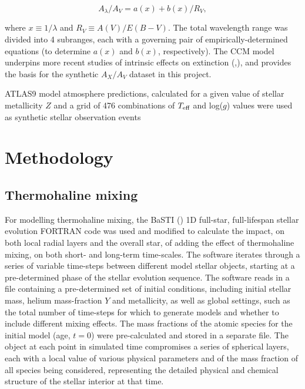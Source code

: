 \documentclass[usenatbib]{mnras}
\begin{document}
\begin{equation}
A_{\lambda}/A_{V} = a(x) + b(x)/R_{V},
\label{CCM_general}
\end{equation}

where $x \equiv 1/\lambda$ and $R_{V} \equiv A(V)/E(B-V)$. The total wavelength range was divided into 4 subranges, each with a governing pair of empirically-determined equations (to determine $a(x)$ and $b(x)$, respectively). The CCM model underpins more recent studies of intrinsic effects on extinction (\citet{2018MNRAS.479L.102C},\citet{2008PASP..120..583G}), and provides the basis for the synthetic  $A_{X}/A_{V}$ dataset in this project.

ATLAS9 model atmosphere predictions, calculated for a given value of stellar metallicity $Z$ and a grid of 476 combinations of $T_{\textnormal{eff}}$ and log($g$) values \citep{2004astro.ph..5087C} were used as synthetic stellar observation events
\section{Methodology} \label{Methodology}
\subsection{Thermohaline mixing}

For modelling thermohaline mixing, the BaSTI (\citet{2004ApJ...612..168P}) 1D full-star, full-lifespan stellar evolution FORTRAN code was used and modified to calculate the impact, on both local radial layers and the overall star, of adding the effect of thermohaline mixing, on both short- and long-term time-scales. The software iterates through a series of variable time-steps between different model stellar objects, starting at a pre-determined phase of the stellar evolution sequence. The software reads in a file containing a pre-determined set of initial conditions, including initial stellar mass, helium mass-fraction $Y$ and metallicity, as well as global settings, such as the total number of time-steps for which to generate models and whether to include different mixing effects. The mass fractions of the atomic species for the initial model (age, $t = 0$) were pre-calculated and stored in a separate file.
The object at each point in simulated time compromises a series of spherical layers, each with a local value of various physical parameters and of the mass fraction of all species being considered, representing the detailed physical and chemical structure of the stellar interior at that time.
\end{document}
